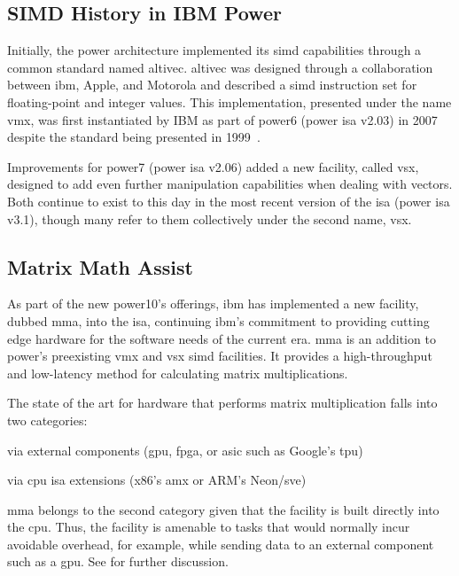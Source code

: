 \documentclass[\main/thesis.tex]{subfiles}
\begin{document}
\subsection{SIMD History in IBM Power}
Initially, the \gls{power} architecture implemented its \gls{simd} capabilities through a common standard named \gls{altivec}.
\Gls{altivec} was designed through a collaboration between \gls{ibm}, Apple, and Motorola and described a \gls{simd} instruction set for floating-point and integer values.
This implementation, presented under the name \gls{vmx}, was first instantiated by IBM as part of \gls{power}6 (\gls{power} \gls{isa} v2.03) in 2007~\autocite{eisen2007ibm} despite the standard being presented in 1999~\autocite{tyler1999altivec}.

Improvements for \gls{power}7 (\gls{power} \gls{isa} v2.06) added a new facility, called \gls{vsx}, designed to add even further manipulation capabilities when dealing with vectors.
Both continue to exist to this day in the most recent version of the \gls{isa} (\gls{power} \gls{isa} v3.1), though many refer to them collectively under the second name, \gls{vsx}.

\subsection{Matrix Math Assist}
\label{sec:mmaintro}
As part of the new \gls{power10}'s offerings, \gls{ibm} has implemented a new facility, dubbed \gls{mma}, into the \gls{isa}, continuing \gls{ibm}'s commitment to providing cutting edge hardware for the software needs of the current era.
\gls{mma} is an addition to \gls{power}'s preexisting \gls{vmx} and \gls{vsx} \gls{simd} facilities.
It provides a high-throughput and low-latency method for calculating matrix multiplications.

The state of the art for hardware that performs matrix multiplication falls into two categories:
\begin{enumerate*}[itemjoin*={{ and }}, label=\textbf{(\arabic*)}, after={.}]
  \item via external components (\eg \gls{gpu}, \gls{fpga}, or \gls{asic} such as Google's \gls{tpu})
  \item via \gls{cpu} \gls{isa} extensions (\eg x86's \gls{amx} or ARM's Neon/\gls{sve})
\end{enumerate*}
\Gls{mma} belongs to the second category given that the facility is built directly into the \gls{cpu}.
Thus, the facility is amenable to tasks that would normally incur avoidable overhead, for example, while sending data to an external component such as a \gls{gpu}.
See  for further discussion.
\end{document}
